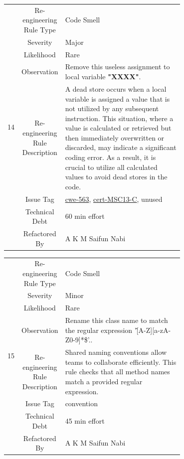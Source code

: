 \documentclass[12pt,letterpaper]{report}
\begin{document}
{\begin{table}
    \begin{tabular}{|c|c|p{0.7\linewidth}|}
    \hline   
    \multirow{8}{*}{14}
        & Re-engineering Rule Type & Code Smell \\
    \cline{2-3}
       & Severity &  Major \\
    \cline{2-3}
       & Likelihood &  Rare\\
    \cline{2-3}
       & Observation & Remove this useless assignment to local variable \textbf{"XXXX"}. \\
    \cline{2-3}
       & Re-engineering Rule Description &  A dead store occurs when a local variable is assigned a value that is not utilized by any subsequent instruction. This situation, where a value is calculated or retrieved but then immediately overwritten or discarded, may indicate a significant coding error. As a result, it is crucial to utilize all calculated values to avoid dead stores in the code. \\
    \cline{2-3}
       & Issue Tag & \href{https://cwe.mitre.org/data/definitions/563}{cwe-563}, \href{https://wiki.sei.cmu.edu/confluence/display/c/MSC13-C.+Detect+and+remove+unused+values}{cert-MSC13-C}, unused\\
    \cline{2-3}
       & Technical Debt & 60 min effort  \\
    \cline{2-3}
       & Refactored By & A K M Saifun Nabi \\
    \hline
    \end{tabular}
\end{table}

\begin{table}
    \begin{tabular}{|c|c|p{0.7\linewidth}|}
    \hline   
    \multirow{8}{*}{15}
        & Re-engineering Rule Type & Code Smell \\
    \cline{2-3}
       & Severity &  Minor \\
    \cline{2-3}
       & Likelihood &  Rare\\
    \cline{2-3}
       & Observation & Rename this class name to match the regular expression '\^[A-Z][a-zA-Z0-9]*\$'.. \\
    \cline{2-3}
       & Re-engineering Rule Description &  Shared naming conventions allow teams to collaborate efficiently. This rule checks that all method names match a provided regular expression. \\
    \cline{2-3}
       & Issue Tag & convention \\
    \cline{2-3}
       & Technical Debt & 45 min effort  \\
    \cline{2-3}
       & Refactored By & A K M Saifun Nabi \\
    \hline
    \end{tabular}
\end{table}

}
\end{document}
